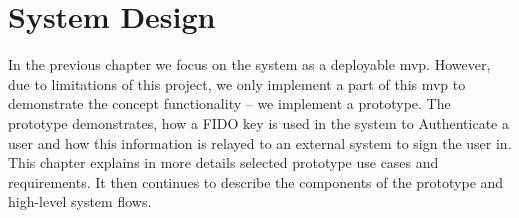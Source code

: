 \section{System Design}

In the previous chapter we focus on the system as a deployable \acrlong{mvp}. However, due to limitations of this project, we only implement a part of this \acrshort{mvp} to demonstrate the concept functionality -- we implement a prototype. The prototype demonstrates, how a FIDO key is used in the system to Authenticate a user and how this information is relayed to an external system to sign the user in. This chapter explains in more details selected prototype use cases and requirements. It then continues to describe the components of the prototype and high-level system flows.







